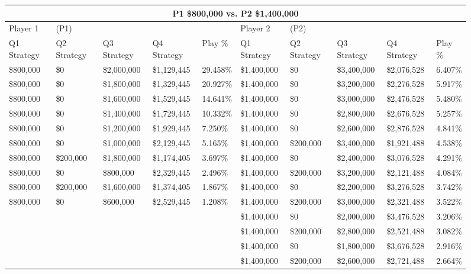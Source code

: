 \documentclass[11pt]{article}
\begin{document}
\begin{figure}
\tiny
\begin{tabular}{ |p{1.0cm}p{1.0cm}p{1.0cm}p{2.0cm}|p{1.0cm}||p{1.0cm}p{1.0cm}p{1.0cm}p{2.0cm}|p{1.0cm}|}
\hline
\multicolumn{10}{|c|}{P1 \$800,000 vs. P2 \$1,400,000} \\
\hline
Player 1 & (P1) & & & & Player 2 & (P2) & & & \\
\hline
Q1 Strategy & Q2 Strategy & Q3 Strategy & Q4 Strategy  &  Play \% & Q1 Strategy & Q2 Strategy & Q3 Strategy & Q4 Strategy  &  Play \%\\
\hline
\$800,000 & \$0 & \$2,000,000 & \$1,129,445 & 29.458\% & \$1,400,000 & \$0 & \$3,400,000 & \$2,076,528 & 6.407\% \\
\$800,000 & \$0 & \$1,800,000 & \$1,329,445 & 20.927\% & \$1,400,000 & \$0 & \$3,200,000 & \$2,276,528 & 5.917\% \\
\$800,000 & \$0 & \$1,600,000 & \$1,529,445 & 14.641\% & \$1,400,000 & \$0 & \$3,000,000 & \$2,476,528 & 5.480\% \\
\$800,000 & \$0 & \$1,400,000 & \$1,729,445 & 10.332\% & \$1,400,000 & \$0 & \$2,800,000 & \$2,676,528 & 5.257\% \\
\$800,000 & \$0 & \$1,200,000 & \$1,929,445 & 7.250\% & \$1,400,000 & \$0 & \$2,600,000 & \$2,876,528 & 4.841\% \\
\$800,000 & \$0 & \$1,000,000 & \$2,129,445 & 5.165\% & \$1,400,000 & \$200,000 & \$3,400,000 & \$1,921,488 & 4.538\% \\
\$800,000 & \$200,000 & \$1,800,000 & \$1,174,405 & 3.697\% & \$1,400,000 & \$0 & \$2,400,000 & \$3,076,528 & 4.291\% \\
\$800,000 & \$0 & \$800,000 & \$2,329,445 & 2.496\% & \$1,400,000 & \$200,000 & \$3,200,000 & \$2,121,488 & 4.084\% \\
\$800,000 & \$200,000 & \$1,600,000 & \$1,374,405 & 1.867\% & \$1,400,000 & \$0 & \$2,200,000 & \$3,276,528 & 3.742\% \\
\$800,000 & \$0 & \$600,000 & \$2,529,445 & 1.208\% & \$1,400,000 & \$200,000 & \$3,000,000 & \$2,321,488 & 3.522\% \\
&  &  &  &  & \$1,400,000 & \$0 & \$2,000,000 & \$3,476,528 & 3.206\% \\
&  &  &  &  & \$1,400,000 & \$200,000 & \$2,800,000 & \$2,521,488 & 3.082\% \\
&  &  &  &  & \$1,400,000 & \$0 & \$1,800,000 & \$3,676,528 & 2.916\% \\
&  &  &  &  & \$1,400,000 & \$200,000 & \$2,600,000 & \$2,721,488 & 2.664\% \\

\end{tabular}
\end{figure}
\end{document}

